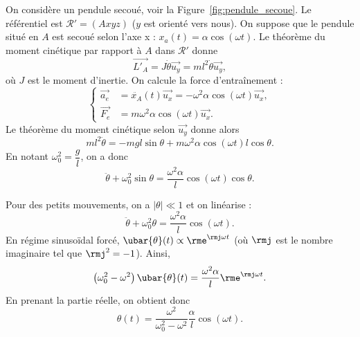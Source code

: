             On considère un pendule secoué, voir la Figure~\ref{fig:pendule_secoue}. Le référentiel est $\mathcal{R}'=(Axyz)$ ($y$ est orienté vers nous). On suppose que le pendule situé en $A$ est secoué selon l'axe x : $x_{a}(t)=\alpha\cos(\omega t)$. Le théorème du moment cinétique par rapport à $A$ dans $\mathcal{R}'$ donne 
            \begin{equation*}
                \vec{L'_{A}}=J\dot{\theta}\vec{u_y}=ml^{2}\dot{\theta}\vec{u_y},
            \end{equation*}
            où $J$ est le moment d'inertie. On calcule la force d'entraînement :
            \begin{equation*}
                \left\lbrace
                \begin{aligned}
                    \vec{a_e} &=\ddot{x_A}(t)\vec{u_x}=-\omega^{2}\alpha\cos(\omega t)\vec{u_x},\\
                    \vec{F_e} &= m\omega^{2}\alpha\cos(\omega t)\vec{u_x}.
                \end{aligned}
                \right.
            \end{equation*}
            Le théorème du moment cinétique selon $\vec{u_y}$ donne alors
            \begin{equation*}
                ml^{2}\ddot{\theta}=-mgl\sin\theta+m\omega^{2}\alpha\cos(\omega t)l\cos\theta.
            \end{equation*}
            En notant $\omega_{0}^{2}=\dfrac{g}{l}$, on a donc 
            \begin{equation*}
                \boxed{
                    \ddot{\theta}+\omega_{0}^{2}\sin\theta=\frac{\omega^{2}\alpha}{l}\cos(\omega t)\cos\theta.
                }
            \end{equation*}

            Pour des petits mouvements, on a $\left\lvert\theta\right\rvert\ll1$ et on linéarise :
            \begin{equation*}
                \ddot{\theta}+\omega_{0}^{2}\theta=\frac{\omega^{2}\alpha}{l}\cos(\omega t).
            \end{equation*}
            En régime sinusoïdal forcé, $\ubar{\theta}(t)\propto\rme^{\rmj \omega t}$ (où $\rmj$ est le nombre imaginaire tel que $\rmj^{2}=-1$). Ainsi,
            \begin{equation*}
                \left(\omega_{0}^{2}-\omega^{2}\right)\ubar{\theta}(t)=\frac{\omega^{2}\alpha}{l}\rme^{\rmj\omega t}.
            \end{equation*}
            En prenant la partie réelle, on obtient donc
            \begin{equation*}
                \boxed{
                    \theta(t)=\frac{\omega^{2}}{\omega_{0}^{2}-\omega^{2}}\frac{\alpha}{l}\cos(\omega t).
                }
            \end{equation*}

